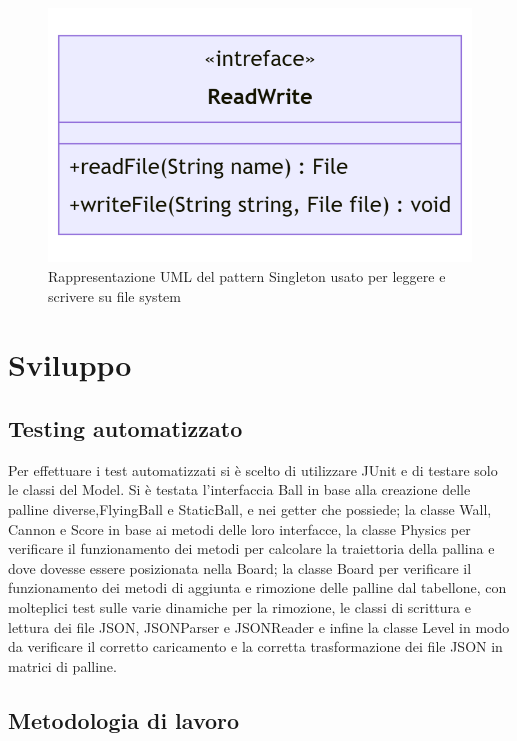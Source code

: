 \documentclass[a4paper,12pt]{report}
\begin{document}
\begin{figure}[H]
\includegraphics[width=\textwidth]{img/Diagramma_UML_Architettura_Singleton}
\caption{Rappresentazione UML del pattern Singleton usato per leggere e scrivere su file system}
\label{img:Diagramma_UML_Architettura_Singleton}
\end{figure}


\chapter{Sviluppo}
\section{Testing automatizzato}

Per effettuare i test automatizzati si è scelto di utilizzare JUnit e di testare solo le classi del Model.
Si è testata l'interfaccia Ball in base alla creazione delle palline diverse,FlyingBall e StaticBall, e nei getter che possiede; la classe Wall, Cannon e Score in base ai metodi delle loro interfacce, la classe Physics per verificare il funzionamento dei metodi per calcolare la traiettoria della pallina e dove dovesse essere posizionata nella Board; la classe Board per verificare il funzionamento dei metodi di aggiunta e rimozione delle palline dal tabellone, con molteplici test sulle varie dinamiche per la rimozione, le classi di scrittura e lettura dei file JSON, JSONParser e JSONReader e infine la classe Level in modo da verificare il corretto caricamento e la corretta trasformazione dei file JSON in matrici di palline.

\section{Metodologia di lavoro}
\end{document}

